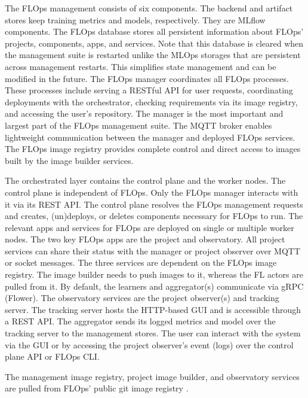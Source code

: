 The FLOps management consists of six components.
The backend and artifact stores keep training metrics and models, respectively.
They are MLflow components.
The FLOps database stores all persistent information about FLOps' projects, components, apps, and services.
Note that this database is cleared when the management suite is restarted unlike the MLOps storages that are persistent across management restarts.
This simplifies state management and can be modified in the future.
The FLOps manager coordinates all FLOps processes.
These processes include serving a RESTful API for user requests, coordinating deployments with the orchestrator, checking requirements via its image registry, and accessing the user's repository.
The manager is the most important and largest part of the FLOps management suite.
The MQTT broker enables lightweight communication between the manager and deployed FLOps services.
The FLOps image registry provides complete control and direct access to images built by the image builder services.

The orchestrated layer contains the control plane and the worker nodes.
The control plane is independent of FLOps.
Only the FLOps manager interacts with it via its REST API.
The control plane resolves the FLOps management requests and creates, (un)deploys, or deletes components necessary for FLOps to run.
The relevant apps and services for FLOps are deployed on single or multiple worker nodes.
The two key FLOps apps are the project and observatory.
All project services can share their status with the manager or project observer over MQTT or socket messages.
The three services are dependent on the FLOps image registry.
The image builder needs to push images to it, whereas the FL actors are pulled from it.
By default, the learners and aggregator(s) communicate via gRPC (Flower).
The observatory services are the project observer(s) and tracking server.
The tracking server hosts the HTTP-based GUI and is accessible through a REST API.
The aggregator sends its logged metrics and model over the tracking server to the management stores.
The user can interact with the system via the GUI or by accessing the project observer's event (logs) over the control plane API or FLOps CLI.

The management image registry, project image builder, and observatory services are pulled from FLOps' public git image registry \cite{flops_code}.


